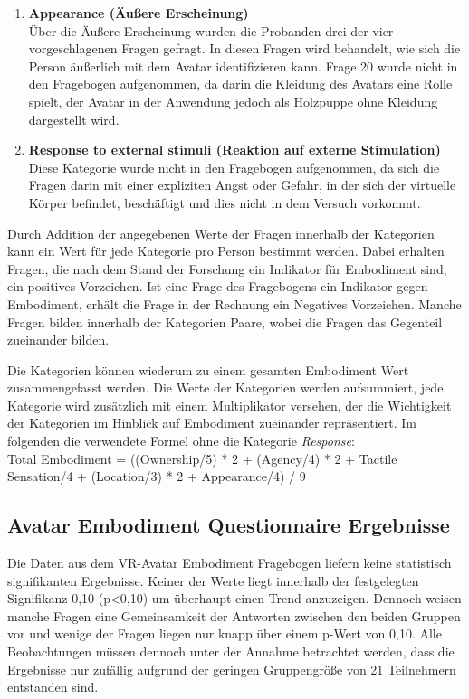 \begin{enumerate}
\item\textbf{Appearance (Äußere Erscheinung)}\\
Über die Äußere Erscheinung wurden die Probanden drei der vier vorgeschlagenen Fragen gefragt. In diesen Fragen wird behandelt, wie sich die Person äußerlich mit dem Avatar identifizieren kann. Frage 20 wurde nicht in den Fragebogen aufgenommen, da darin die Kleidung des Avatars eine Rolle spielt, der Avatar in der Anwendung jedoch als Holzpuppe ohne Kleidung dargestellt wird.

\item\textbf{Response to external stimuli (Reaktion auf externe Stimulation)}\\
Diese Kategorie wurde nicht in den Fragebogen aufgenommen, da sich die Fragen darin mit einer expliziten Angst oder Gefahr, in der sich der virtuelle Körper befindet, beschäftigt und dies nicht in dem Versuch vorkommt.

\end{enumerate}

Durch Addition der angegebenen Werte der Fragen innerhalb der Kategorien kann ein Wert für jede Kategorie pro Person bestimmt werden. Dabei erhalten Fragen, die nach dem Stand der Forschung ein Indikator für Embodiment sind, ein positives Vorzeichen. Ist eine Frage des Fragebogens ein Indikator gegen Embodiment, erhält die Frage in der Rechnung ein Negatives Vorzeichen.
Manche Fragen bilden innerhalb der Kategorien Paare, wobei die Fragen das Gegenteil zueinander bilden.

Die Kategorien können wiederum zu einem gesamten Embodiment Wert zusammengefasst werden. Die Werte der Kategorien werden aufsummiert, jede Kategorie wird zusätzlich mit einem Multiplikator versehen, der die Wichtigkeit der Kategorien im Hinblick auf Embodiment  zueinander repräsentiert. Im folgenden die verwendete Formel ohne die Kategorie \textit{Response}:\\
Total Embodiment = ((Ownership/5) * 2 + (Agency/4) * 2 + Tactile Sensation/4 + (Location/3) * 2 + Appearance/4) / 9




\subsection{Avatar Embodiment Questionnaire Ergebnisse}
Die Daten aus dem VR-Avatar Embodiment Fragebogen liefern keine statistisch signifikanten Ergebnisse. Keiner der Werte liegt innerhalb der festgelegten Signifikanz 0,10 (p<0,10) um überhaupt einen Trend anzuzeigen. Dennoch weisen manche Fragen eine Gemeinsamkeit der Antworten zwischen den beiden Gruppen vor und wenige der Fragen liegen nur knapp über einem p-Wert von 0,10. Alle Beobachtungen müssen dennoch unter der Annahme betrachtet werden, dass die Ergebnisse nur zufällig aufgrund der geringen Gruppengröße von 21 Teilnehmern entstanden sind.

